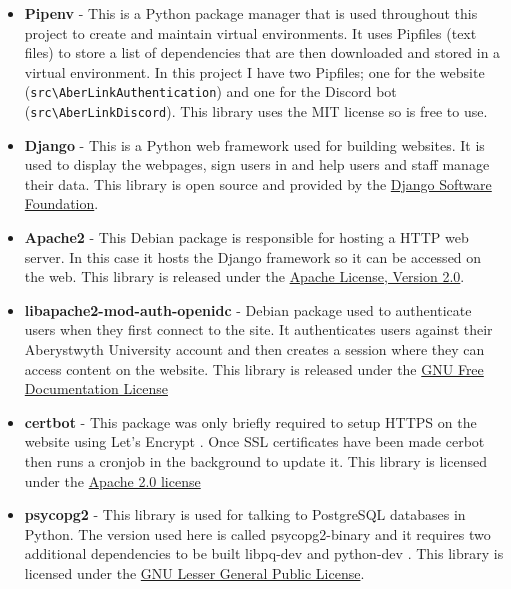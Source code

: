 \begin{itemize}
    \item \textbf{Pipenv} \cite{pipenv} - This is a Python package manager that is used throughout this project to create and maintain virtual environments. It uses Pipfiles (text files) to store a list of dependencies that are then downloaded and stored in a virtual environment. In this project I have two Pipfiles; one for the website (\verb|src\AberLinkAuthentication|) and one for the Discord bot (\verb|src\AberLinkDiscord|). This library uses the MIT license so is free to use.
    \item \textbf{Django} \cite{Django} - This is a Python web framework used for building websites. It is used to display the webpages, sign users in and help users and staff manage their data. This library is open source and provided by the \href{https://www.djangoproject.com/trademarks/#:~:text=Django%20is%20an%20Open%20Source,the%20use%20of%20a%20trademark.}{Django Software Foundation}.
    \item \textbf{Apache2} \cite{apache2} - This Debian \cite{debian} package is responsible for hosting a HTTP web server. In this case it hosts the Django \cite{Django} framework so it can be accessed on the web. This library is released under the \href{https://www.apache.org/licenses/LICENSE-2.0}{Apache License, Version 2.0}.
    \item \textbf{libapache2-mod-auth-openidc} \cite{libapache2-mod-auth-openidc} - Debian \cite{debian} package used to authenticate users when they first connect to the site. It authenticates users against their Aberystwyth University account and then creates a session where they can access content on the website. This library is released under the \href{https://static.fsf.org/nosvn/directory/fdl-1.3-standalone.html}{GNU Free Documentation License}
    \item \textbf{certbot} \cite{certbot} - This package was only briefly required to setup HTTPS on the website using Let's Encrypt \cite{letsencrypt}. Once SSL certificates have been made cerbot then runs a cronjob in the background to update it. This library is licensed under the \href{https://certbot.eff.org/faq#what-are-the-licenses-for-certbot-and-this-website}{Apache 2.0 license}
    \item \textbf{psycopg2} \cite{psycopg2} - This library is used for talking to PostgreSQL databases in Python. The version used here is called psycopg2-binary and it requires two additional dependencies to be built libpq-dev \cite{libpq-dev} and python-dev \cite{python-dev}. This library is licensed under the \href{https://www.psycopg.org/license/}{GNU Lesser General Public License}.

\end{itemize}
